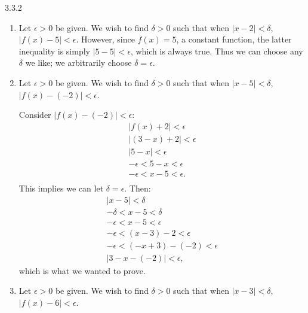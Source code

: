 \begin{Answer}{3.3.2}
\begin{enumerate}
\item {Let $\epsilon >0$ be given. We wish to find $\delta >0$ such that when $|x-2|<\delta$, $|f(x)-5|<\epsilon$. However, since $f(x)=5$, a constant function, the latter inequality is simply $|5-5|<\epsilon$, which is always true. Thus we can choose any $\delta$ we like; we arbitrarily choose $\delta =\epsilon$.
}
\item {Let $\epsilon >0$ be given. We wish to find $\delta >0$ such that when $|x-5|<\delta$, $|f(x)-(-2)|<\epsilon$.

Consider $|f(x)-(-2)|<\epsilon$:
\begin{gather*}
|f(x) + 2 | < \epsilon \\
|(3-x) + 2 |<\epsilon \\
| 5-x | < \epsilon \\
-\epsilon < 5-x < \epsilon \\
-\epsilon < x-5 < \epsilon. \\
\end{gather*}
This implies we can let $\delta =\epsilon$. Then:
\begin{gather*}
|x-5|<\delta \\
-\delta < x-5 < \delta\\
-\epsilon < x-5 < \epsilon\\
-\epsilon < (x-3)-2 < \epsilon \\
-\epsilon < (-x+3)-(-2) < \epsilon \\
|3-x - (-2)| < \epsilon,
\end{gather*}
which is what we wanted to prove.
}

\item {Let $\epsilon >0$ be given. We wish to find $\delta >0$ such that when $|x-3|<\delta$, $|f(x)-6|<\epsilon$.

}
\end{enumerate}
\end{Answer}
